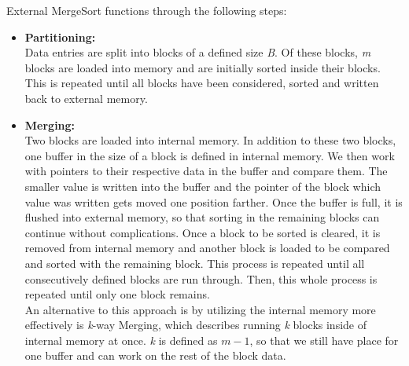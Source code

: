 \documentclass[twocolumn]{article}
\begin{document}
External MergeSort functions through the following steps:
\begin{itemize}
	\item \textbf{Partitioning:}\\
	Data entries are split into blocks of a defined size \textit{B}. Of these blocks, \textit{m} blocks are loaded into memory and are initially sorted inside their blocks. This is repeated until all blocks have been considered, sorted and written back to external memory.
	\item \textbf{Merging:}\\
	Two blocks are loaded into internal memory. In addition to these two blocks, one buffer in the size of a block is defined in internal memory. We then work with pointers to their respective data in the buffer and compare them. The smaller value is written into the buffer and the pointer of the block which value was written gets moved one position farther. Once the buffer is full, it is flushed into external memory, so that sorting in the remaining blocks can continue without complications. Once a block to be sorted is cleared, it is removed from internal memory and another block is loaded to be compared and sorted with the remaining block. This process is repeated until all consecutively defined blocks are run through. Then, this whole process is repeated until only one block remains.\\
	An alternative to this approach is by utilizing the internal memory more effectively is \textit{k}-way Merging, which describes running \textit{k} blocks inside of internal memory at once. \textit{k} is defined as $m-1$, so that we still have place for one buffer and can work on the rest of the block data.
	
\end{itemize}
\end{document}
